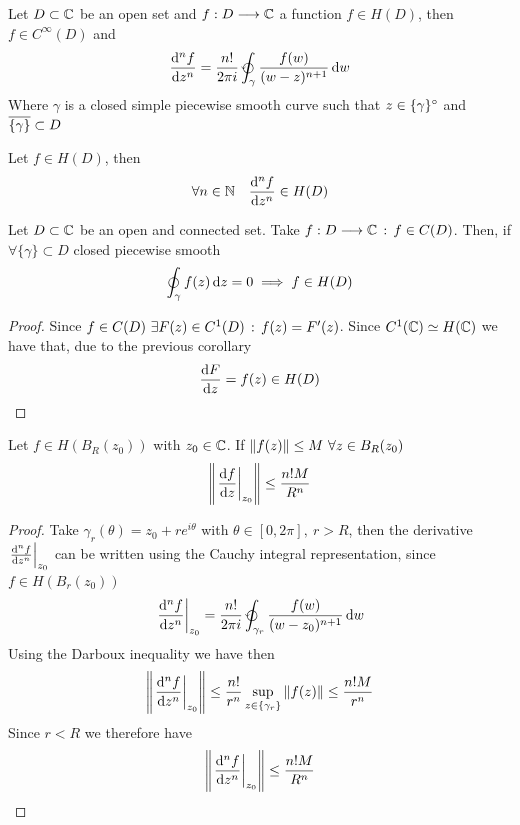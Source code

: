 \documentclass[../complete.tex]{subfiles}
\begin{document}
\begin{thm}
	Let $D\subset\mathbb{C}$ be an open set and $f:D\overset{}{\longrightarrow}\mathbb{C}$ a function $f\in H(D)$, then $f\in C^{\infty}(D)$ and
	\begin{equation}
		\derivative[n]{f}{z}=\frac{n!}{2\pi i}\ointccw_{\gamma}\frac{f(w)}{(w-z)^{n+1}}\diff w
		\label{eq:derivativeintrep}
	\end{equation}
	Where $\gamma$ is a closed simple piecewise smooth curve such that $z\in\{\gamma\}^{\circ}$ and $\overline{\{\gamma\}}\subset D$
\end{thm}
\begin{cor}
	Let $f\in H(D)$, then
	\begin{equation*}
		\forall n\in\N\quad\derivative[n]{f}{z}\in H(D)
	\end{equation*}
\end{cor}
\begin{thm}[Morera]
	Let $D\subset\mathbb{C}$ be an open and connected set. Take $f:D\overset{}{\longrightarrow}\mathbb{C}\, :\,  f\in C(D)$. Then, if $\forall\{\gamma\}\subset D$ closed piecewise smooth
	\begin{equation}
		\oint_\gamma f(z)\operatorname{d\!} z=0\implies{} f\in H(D)
		\label{eq:morera}
	\end{equation}
\end{thm}
\begin{proof}
	Since $f\in C(D)\ \exists F(z)\in C^1(D)\, :\,  f(z)=F'(z)$. Since $C^1(\mathbb{C})\simeq H(\mathbb{C})$ we have that, due to the previous corollary
	\begin{equation*}
		\derivative{F}{z}=f(z)\in H(D)
	\end{equation*}
\end{proof}
\begin{thm}
	Let $f\in H(B_R(z_0))$ with $z_0\in\mathbb{C}$. If $\norm{f(z)}\le M\ \forall z\in B_R(z_0)$
	\begin{equation}
		\norm{\left.\derivative{f}{z}\right|_{z_0}}\le\frac{n!M}{R^n}
			\label{eq:cauchyineq}
		\end{equation}
	\end{thm}
	\begin{proof}
		Take $\gamma_r(\theta)=z_0+re^{i\theta}$ with $\theta\in[0,2\pi],\ r>R$, then the derivative $\left.\derivative[n]{f}{z}\right|_{z_0}$ can be written using the Cauchy integral representation, since $f\in H(B_r(z_0))$
			\begin{equation*}
				\left.\derivative[n]{f}{z}\right|_{z_0}=\frac{n!}{2\pi i}\ointccw_{\gamma_r}\frac{f(w)}{(w-z_0)^{n+1}}\diff w
				\end{equation*}
				Using the Darboux inequality we have then
				\begin{equation*}
					\norm{\left.\derivative[n]{f}{z}\right|_{z_0}}\le\frac{n!}{r^n}\sup_{z\in\{\gamma_r\}}\norm{f(z)}\le\frac{n!M}{r^n}
					\end{equation*}
					Since $r<R$ we therefore have
					\begin{equation*}
						\norm{\left.\derivative[n]{f}{z}\right|_{z_0}}\le\frac{n!M}{R^n}
						\end{equation*}
					\end{proof}
\end{document}
